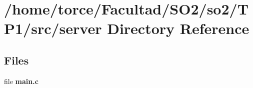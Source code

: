 \section{/home/torce/\+Facultad/\+S\+O2/so2/\+T\+P1/src/server Directory Reference}
\label{dir_075bb3ff235063c77951cd176d15a741}
\subsection*{Files}
\begin{DoxyCompactItemize}
\item 
file \textbf{ main.\+c}
\end{DoxyCompactItemize}
